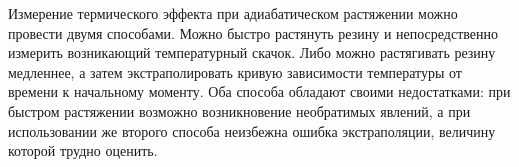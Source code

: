 Измерение термического эффекта при адиабатическом растяжении можно
провести двумя способами. Можно быстро растянуть резину и непосредственно измерить
возникающий температурный скачок. Либо можно
растягивать резину медленнее, а затем экстраполировать кривую зависимости
температуры от времени к начальному моменту. Оба способа обладают своими недостатками:
при быстром растяжении возможно возникновение необратимых явлений, а при использовании
же второго способа неизбежна ошибка экстраполяции, величину которой трудно оценить.
